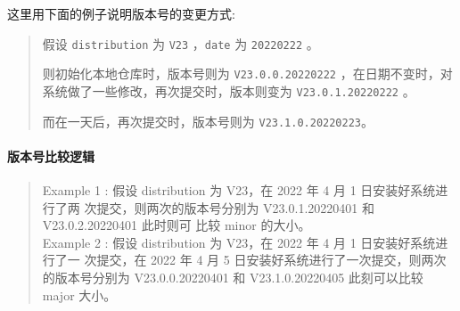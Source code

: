 \documentclass{utart}
\begin{document}
这里用下面的例子说明版本号的变更方式:

\begin{quote}
假设 \texttt{distribution} 为 \texttt{V23} ，\texttt{date} 为 \texttt{20220222} 。

则初始化本地仓库时，版本号则为 \texttt{V23.0.0.20220222} ，在日期不变时，对系统做了一些修改，再次提交时，版本则变为 \texttt{V23.0.1.20220222} 。

而在一天后，再次提交时，版本号则为 \texttt{V23.1.0.20220223}。
\end{quote}
\paragraph{版本号比较逻辑}
\begin{quote}
Example 1 : 假设 distribution 为 V23，在 2022 年 4 月 1 日安装好系统进行了两
次提交，则两次的版本号分别为 V23.0.1.20220401 和 V23.0.2.20220401 此时则可
比较 minor 的大小。\\

Example 2 : 假设 distribution 为 V23，在 2022 年 4 月 1 日安装好系统进行了一
次提交，在 2022 年 4 月 5 日安装好系统进行了一次提交，则两次的版本号分别为
V23.0.0.20220401 和 V23.1.0.20220405 此刻可以比较 major 大小。
\end{quote}
\end{document}
